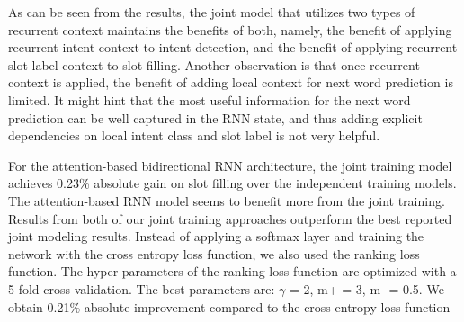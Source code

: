 \par
As can be seen from the results, the joint model that utilizes two types of recurrent context maintains the benefits of both, namely, the benefit of applying recurrent intent
context to intent detection, and the benefit of applying recurrent slot label context to slot filling. Another observation is that once recurrent context is applied, the benefit of adding local context for next word prediction is limited. It might hint that the most useful information for the next word prediction can be well captured in the RNN state, and thus adding explicit dependencies on local intent class and slot label is not very helpful.
\par
For the attention-based bidirectional RNN architecture, the joint training model achieves 0.23\% absolute gain on slot filling over the independent training models. The attention-based
RNN model seems to benefit more from the joint training. Results from both of our joint training approaches outperform the best reported joint modeling results. Instead of applying a softmax layer and training the network with the cross entropy loss function, we also used the ranking loss
function. The hyper-parameters of the ranking loss function are optimized with a 5-fold cross validation. The best parameters are: $\gamma$ = 2, m+ = 3, m- = 0.5. We obtain 0.21\% absolute improvement compared to the cross entropy loss function

